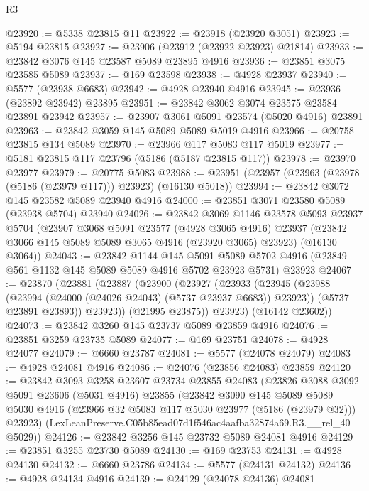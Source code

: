 \begin{lexlean}{R3}
\begin{coremodule}
@23920 := @5338 @23815 @11
@23922 := @23918 (@23920 @3051)
@23923 := @5194 @23815
@23927 := @23906 (@23912 (@23922 @23923) @21814)
@23933 := @23842 @3076 @145 @23587 @5089 @23895 @4916
@23936 := @23851 @3075 @23585 @5089
@23937 := @169 @23598
@23938 := @4928 @23937
@23940 := @5577 (@23938 @6683)
@23942 := @4928 @23940 @4916
@23945 := @23936 (@23892 @23942) @23895
@23951 := @23842 @3062 @3074 @23575 @23584 @23891 @23942
@23957 := @23907 @3061 @5091 @23574 (@5020 @4916) @23891
@23963 := @23842 @3059 @145 @5089 @5089 @5019 @4916
@23966 := @20758 @23815 @134 @5089
@23970 := @23966 @117 @5083 @117 @5019
@23977 := @5181 @23815 @117 @23796 (@5186 (@5187 @23815 @117))
@23978 := @23970 @23977
@23979 := @20775 @5083
@23988 := @23951 (@23957 (@23963 (@23978 (@5186 (@23979 @117))) @23923) (@16130 @5018))
@23994 := @23842 @3072 @145 @23582 @5089 @23940 @4916
@24000 := @23851 @3071 @23580 @5089 (@23938 @5704) @23940
@24026 := @23842
    @3069
    @1146
    @23578
    @5093
    @23937
    @5704
    (@23907
      @3068
      @5091
      @23577
      (@4928 @3065 @4916)
      @23937
      (@23842 @3066 @145 @5089 @5089 @3065 @4916 (@23920 @3065) @23923)
      (@16130 @3064))
@24043 := @23842
    @1144
    @145
    @5091
    @5089
    @5702
    @4916
    (@23849 @561 @1132 @145 @5089 @5089 @4916 @5702 @23923 @5731)
    @23923
@24067 := @23870
    (@23881
      (@23887
        (@23900
          (@23927
            (@23933
              (@23945
                (@23988 (@23994 (@24000 (@24026 @24043) (@5737 @23937 @6683)) @23923))
                (@5737 @23891 @23893))
              @23923))
          (@21995 @23875))
        @23923)
      (@16142 @23602))
@24073 := @23842 @3260 @145 @23737 @5089 @23859 @4916
@24076 := @23851 @3259 @23735 @5089
@24077 := @169 @23751
@24078 := @4928 @24077
@24079 := @6660 @23787
@24081 := @5577 (@24078 @24079)
@24083 := @4928 @24081 @4916
@24086 := @24076 (@23856 @24083) @23859
@24120 := @23842
    @3093
    @3258
    @23607
    @23734
    @23855
    @24083
    (@23826
      @3088
      @3092
      @5091
      @23606
      (@5031 @4916)
      @23855
      (@23842
        @3090
        @145
        @5089
        @5089
        @5030
        @4916
        (@23966 @32 @5083 @117 @5030 @23977 (@5186 (@23979 @32)))
        @23923)
      (LexLeanPreserve.C05b85ead07d1f546ac4aafba32874a69.R3.__rel_40 @5029))
@24126 := @23842 @3256 @145 @23732 @5089 @24081 @4916
@24129 := @23851 @3255 @23730 @5089
@24130 := @169 @23753
@24131 := @4928 @24130
@24132 := @6660 @23786
@24134 := @5577 (@24131 @24132)
@24136 := @4928 @24134 @4916
@24139 := @24129 (@24078 @24136) @24081

\end{coremodule}
\end{lexlean}
